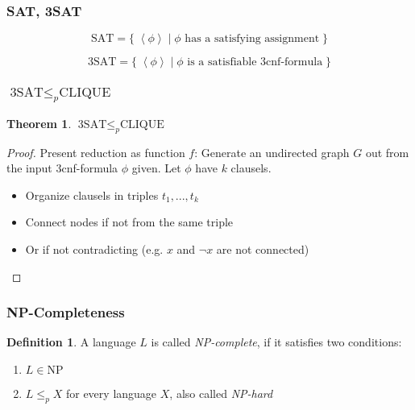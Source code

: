 \documentclass[notheorems]{beamer}
\theoremstyle{definition}
\newtheorem{definition}{Definition}
\newtheorem{theorem}{Theorem}
\theoremstyle{remark}
\newcommand{\npclass}{\text{NP}}
\newcommand{\cliqueprob}{\text{CLIQUE}}
\newcommand{\satprob}{\text{SAT}}
\newcommand{\threesatprob}{\text{3SAT}}
\newcommand{\lpp}{\left \langle}
\newcommand{\rpp}{\right \rangle}
\newcommand{\enc}[1]{\lpp #1 \rpp}
\begin{document}
\begin{frame}
    \frametitle{SAT, 3SAT}

    \pause

    \[
        \satprob = \{ \;\enc{\phi} \mid \phi \text{ has a satisfying assignment} \; \}
    \]

    \pause

    \[
        \threesatprob = \{ \; \enc{\phi} \mid \phi \text{ is a satisfiable 3cnf-formula} \; \}
    \]

\end{frame}

\begin{frame}
    \frametitle{\(\threesatprob \leq_p \cliqueprob\)}

    \begin{theorem}
        \(\threesatprob \leq_p \cliqueprob\)
    \end{theorem}

    \pause

    \begin{proof} Present reduction as function \(f\): Generate an undirected graph \(G\) out from the input 3cnf-formula \(\phi\) given. Let \(\phi\) have \(k\) clausels.

        \begin{itemize}
            \item Organize clausels in triples \(t_1, ..., t_k\)
            \item Connect nodes if not from the same triple
            \item Or if not contradicting (e.g. \(x\) and \(\neg x\) are not connected)
        \end{itemize}


        
    \end{proof}

\end{frame}

\begin{frame}
    \frametitle{NP-Completeness}

    \begin{definition} A language \(L\) is called \emph{NP-complete}, if it satisfies two conditions:
        \begin{enumerate}
    
            \item \(L \in \npclass\)
    
            \item \(L \leq_p X\) for every language \(X\), also called \emph{NP-hard}
    
        \end{enumerate}
    \end{definition}

\end{frame}
\end{document}
